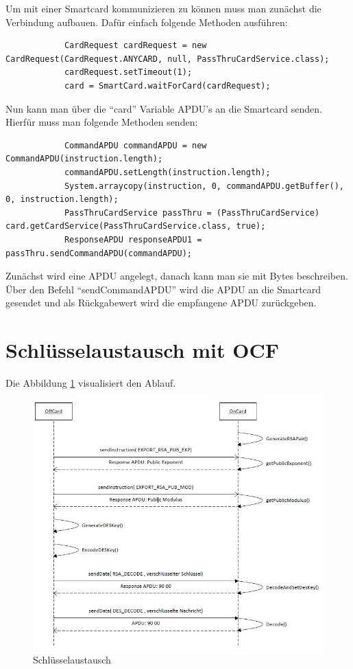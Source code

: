 \documentclass[parskip]{scrartcl}
\begin{document}
		Um mit einer Smartcard kommunizieren zu können muss man zunächst die Verbindung aufbauen. Dafür einfach folgende Methoden ausführen:
		
		\begin{lstlisting}
			CardRequest cardRequest = new CardRequest(CardRequest.ANYCARD, null, PassThruCardService.class);
			cardRequest.setTimeout(1);
			card = SmartCard.waitForCard(cardRequest);
		\end{lstlisting}
		
		Nun kann man über die \enquote{card} Variable APDU's an die Smartcard senden. Hierfür muss man folgende Methoden senden:
		
		\begin{lstlisting}
			CommandAPDU commandAPDU = new CommandAPDU(instruction.length);
			commandAPDU.setLength(instruction.length);
			System.arraycopy(instruction, 0, commandAPDU.getBuffer(), 0, instruction.length);
			PassThruCardService passThru = (PassThruCardService) card.getCardService(PassThruCardService.class, true);
			ResponseAPDU responseAPDU1 = passThru.sendCommandAPDU(commandAPDU);
		\end{lstlisting}
		
		Zunächst wird eine APDU angelegt, danach kann man sie mit Bytes beschreiben. Über den Befehl \enquote{sendCommandAPDU} wird die APDU an die Smartcard gesendet und als Rückgabewert wird die empfangene APDU zurückgeben.
		
	\section{Schlüsselaustausch mit OCF}
		Die Abbildung \ref{fig:KeyExchange} visualisiert den Ablauf.
		
		\begin{figure}[H]
			\centering
			\includegraphics[width=\linewidth]{./KeyExchange}
			\caption{Schlüsselaustausch}
			\label{fig:KeyExchange}
		\end{figure}
		
\end{document}
